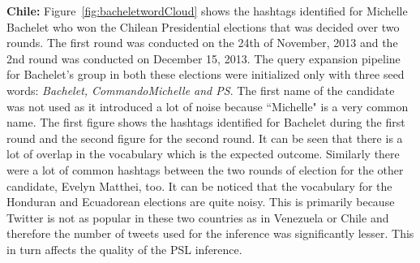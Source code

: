 {\bf Chile:}
Figure~\ref{fig:bacheletwordCloud} shows the hashtags identified for Michelle Bachelet who won the Chilean Presidential elections that was decided over two rounds.
The first round was conducted on the 24th of November, 2013 and the 2nd round was conducted on December 15, 2013. 
The query expansion pipeline for Bachelet's group in both these elections were initialized only with three seed words: {\it Bachelet, CommandoMichelle and PS}. 
The first name of the candidate was not used as it introduced a lot of noise because ``Michelle" is a very common name.
The first figure shows the hashtags identified for Bachelet during the first round and the second figure for the second round. 
It can be seen that there is a lot of overlap in the vocabulary which is the expected outcome. 
Similarly there were a lot of common hashtags between the two rounds of election for the other candidate, Evelyn Matthei, too.
It can be noticed that the vocabulary for the Honduran and Ecuadorean  elections are quite noisy. 
This is primarily because Twitter is not as popular in these two countries as in Venezuela or Chile and therefore the number of tweets
used for the inference was significantly lesser.
This in turn affects the quality of the PSL inference.


